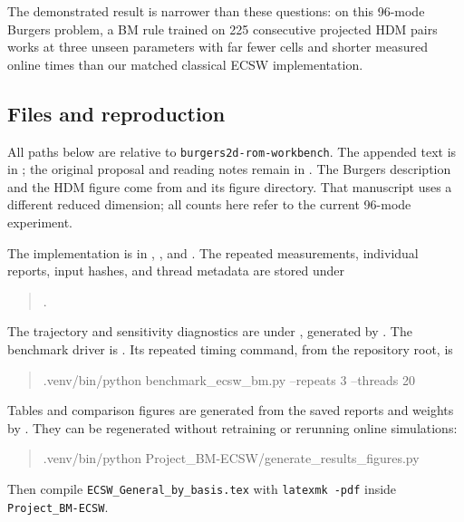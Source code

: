 The demonstrated result is narrower than these questions: on this 96-mode Burgers problem, a BM rule trained on 225 consecutive projected HDM pairs works at three unseen parameters with far fewer cells and shorter measured online times than our matched classical ECSW implementation.

\subsection{Files and reproduction}
\label{sec:impl-reproduction}

All paths below are relative to \texttt{burgers2d-rom-workbench}. The appended text is in ; the original proposal and reading notes remain in . The Burgers description and the HDM figure come from  and its figure directory. That manuscript uses a different reduced dimension; all counts here refer to the current 96-mode experiment.

The implementation is in , , and . The repeated measurements, individual reports, input hashes, and thread metadata are stored under
\begin{quote}\small
 .
\end{quote}
The trajectory and sensitivity diagnostics are under , generated by . The benchmark driver is . Its repeated timing command, from the repository root, is
\begin{quote}\small\ttfamily
 .venv/bin/python benchmark\_ecsw\_bm.py --repeats 3 --threads 20
\end{quote}
Tables and comparison figures are generated from the saved reports and weights by . They can be regenerated without retraining or rerunning online simulations:
\begin{quote}\small\ttfamily
 .venv/bin/python Project\_BM-ECSW/generate\_results\_figures.py
\end{quote}
Then compile \texttt{ECSW\_General\_by\_basis.tex} with \texttt{latexmk -pdf} inside \texttt{Project\_BM-ECSW}.

